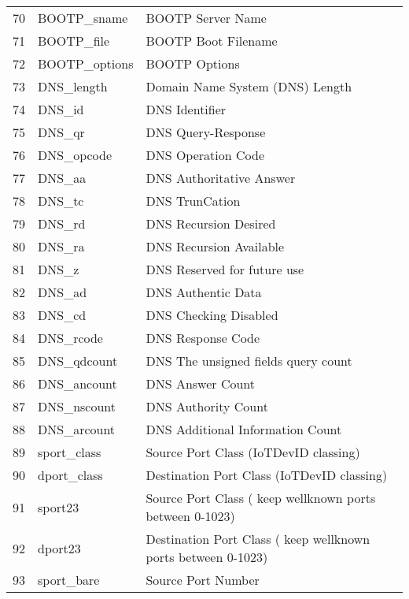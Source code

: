 \documentclass{article}
\begin{document}
\begin{table}[htbp]
{\begin{tabular}{rll}
				70    & BOOTP\_sname & BOOTP Server Name \\
				\rowcolor[rgb]{ .851,  .851,  .851} 71    & BOOTP\_file & BOOTP  Boot Filename \\
				72    & BOOTP\_options & BOOTP Options \\
				\rowcolor[rgb]{ .851,  .851,  .851} 73    & DNS\_length & Domain Name System (DNS) Length \\
				74    & DNS\_id & DNS Identifier \\
				\rowcolor[rgb]{ .851,  .851,  .851} 75    & DNS\_qr & DNS Query-Response \\
				76    & DNS\_opcode & DNS Operation Code \\
				\rowcolor[rgb]{ .851,  .851,  .851} 77    & DNS\_aa & DNS Authoritative Answer \\
				78    & DNS\_tc & DNS TrunCation \\
				\rowcolor[rgb]{ .851,  .851,  .851} 79    & DNS\_rd & DNS Recursion Desired \\
				80    & DNS\_ra & DNS Recursion Available \\
				\rowcolor[rgb]{ .851,  .851,  .851} 81    & DNS\_z & DNS Reserved for future use \\
				82    & DNS\_ad & DNS Authentic Data \\
				\rowcolor[rgb]{ .851,  .851,  .851} 83    & DNS\_cd & DNS Checking Disabled \\
				84    & DNS\_rcode & DNS Response Code  \\
				\rowcolor[rgb]{ .851,  .851,  .851} 85    & DNS\_qdcount & DNS The unsigned fields query count \\
				86    & DNS\_ancount & DNS Answer Count \\
				\rowcolor[rgb]{ .851,  .851,  .851} 87    & DNS\_nscount & DNS  Authority Count \\
				88    & DNS\_arcount & DNS Additional Information Count \\
				\rowcolor[rgb]{ .851,  .851,  .851} 89    & sport\_class & Source Port Class (IoTDevID classing) \\
				90    & dport\_class & Destination Port Class  (IoTDevID classing) \\
				\rowcolor[rgb]{ .851,  .851,  .851} 91    & sport23 & Source Port Class ( keep wellknown ports between 0-1023) \\
				92    & dport23 & Destination Port Class ( keep wellknown ports between 0-1023) \\
				\rowcolor[rgb]{ .851,  .851,  .851} 93    & sport\_bare & Source Port Number \\

\end{tabular}}
\end{table}
\end{document}
